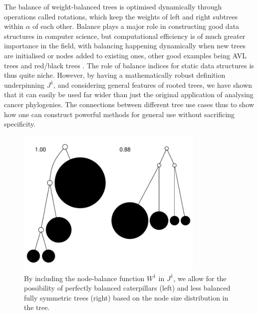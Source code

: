 The balance of weight-balanced trees is optimised dynamically through operations called rotations, which keep the weights of left and right subtrees within $\alpha$ of each other. Balance plays a major role in constructing good data structures in computer science, but computational efficiency is of much greater importance in the field, with balancing happening dynamically when new trees are initialised or nodes added to existing ones, other good examples being AVL trees and red/black trees \cite{noauthor_art_nodate}. The role of balance indices for static data structures is thus quite niche. However, by having a mathematically robust definition underpinning $J^1$, and considering general features of rooted trees, we have shown that it can easily be used far wider than just the original application of analysing cancer phylogenies. The connections between different tree use cases thus to show how one can construct powerful methods for general use without sacrificing specificity.

\begin{figure}
    \centering
    \includegraphics[width=0.8\textwidth]{Chapter_trees/figures/balcat.pdf}
    \caption{By including the node-balance function $W^1$ in $J^1$, we allow for the possibility of perfectly balanced caterpillars (left) and less balanced fully symmetric trees (right) based on the node size distribution in the tree.}
    \label{balcat}
\end{figure}

